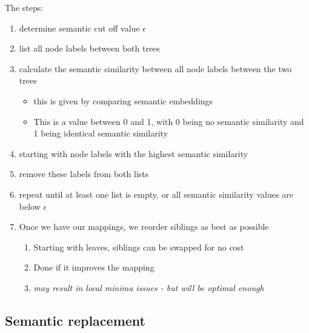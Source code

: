 The steps:
\begin{enumerate}
    \item determine semantic cut off value $\epsilon$
    \item list all node labels between both trees
    \item calculate the semantic similarity between all node labels between the two trees
          \begin{itemize}
              \item this is given by comparing semantic embeddings
              \item This is a value between 0 and 1, with 0 being no semantic similarity and 1 being identical semantic similarity
          \end{itemize}
    \item starting with node labels with the highest semantic similarity
    \item remove these labels from both lists
    \item repeat until at least one list is empty, or all semantic similarity values are below $\epsilon$
\item Once we have our mappings, we reorder siblings as best as possible
\begin{enumerate}
    \item Starting with leaves, siblings can be swapped for no cost
    \item Done if it improves the mapping
    \item \textit{may result in local minima issues - but will be optimal enough}
\end{enumerate}
\end{enumerate}


\subsection{Semantic replacement}

